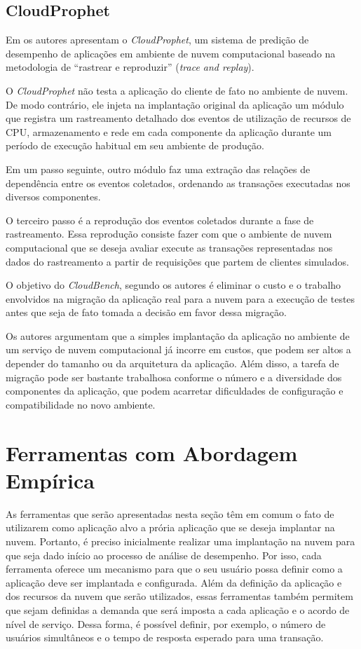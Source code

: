 \subsection{CloudProphet}
Em \cite{li2011cloudprophet} os autores apresentam o \textit{CloudProphet}, um sistema de
predição de desempenho de aplicações em ambiente de nuvem computacional baseado 
na metodologia de ``rastrear e reproduzir'' (\textit{trace and replay}).

O \textit{CloudProphet} não testa a aplicação do cliente de fato no ambiente de nuvem. De
modo contrário, ele injeta na implantação original da aplicação um módulo que 
registra um rastreamento detalhado dos eventos de utilização de recursos de CPU,
armazenamento e rede em cada componente da aplicação durante um período de 
execução habitual em seu ambiente de produção.

Em um passo seguinte, outro módulo faz uma extração das relações de dependência 
entre os eventos coletados, ordenando as transações executadas nos diversos 
componentes.

O terceiro passo é a reprodução dos eventos coletados durante a fase de 
rastreamento. Essa reprodução consiste fazer com que o ambiente de nuvem 
computacional que se deseja avaliar execute as transações representadas nos dados
do rastreamento a partir de requisições que partem de clientes simulados.
   
O objetivo do \textit{CloudBench}, segundo os autores é eliminar o custo e o trabalho 
envolvidos na migração da aplicação real para a nuvem para a execução de testes 
antes que seja de fato tomada a decisão em favor dessa migração.

Os autores argumentam que a simples implantação da aplicação no ambiente de um
serviço de nuvem computacional já incorre em custos, que podem ser altos a 
depender do tamanho ou da arquitetura da aplicação. Além disso, a tarefa de
migração pode ser bastante trabalhosa conforme o número e a diversidade dos 
componentes da aplicação, que podem acarretar dificuldades de configuração e
compatibilidade no novo ambiente.

\section{Ferramentas com Abordagem Empírica}
As ferramentas que serão apresentadas nesta seção têm em comum o fato de utilizarem como aplicação alvo a prória aplicação que se deseja implantar na nuvem. Portanto, é preciso inicialmente realizar uma implantação na nuvem para que seja dado início ao processo de análise de desempenho. Por isso, cada ferramenta oferece um mecanismo para que o seu usuário possa definir como a aplicação deve ser implantada e configurada. Além da definição da aplicação e dos recursos da nuvem que serão utilizados, essas ferramentas também permitem que sejam definidas a demanda que será imposta a cada aplicação e o acordo de nível de serviço. Dessa forma, é possível definir, por exemplo, o número de usuários simultâneos e o tempo de resposta esperado para uma transação.

